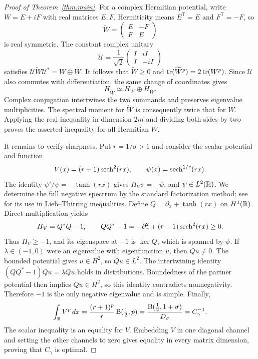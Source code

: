\begin{proof}[Proof of Theorem~\ref{thm:main}]
For a complex Hermitian potential, write $W=E+iF$ with real matrices $E,F$.
Hermiticity means $E^{\mathsf T}=E$ and $F^{\mathsf T}=-F$, so
\[
 \widetilde W=\begin{pmatrix}E&-F\\ F&E\end{pmatrix}
\]
is real symmetric.  The constant complex unitary
\[
 \mathcal U=\frac1{\sqrt2}
             \begin{pmatrix}I&iI\\ I&-iI\end{pmatrix}
\]
satisfies $\mathcal U\widetilde W\mathcal U^*
=W\oplus\overline W$.  It follows that $\widetilde W\geq0$ and
$\operatorname{tr}(\widetilde W^p)=2\operatorname{tr}(W^p)$.  Since $\mathcal U$ also commutes with
differentiation, the same change of coordinates gives
\[
 H_{\widetilde W}\simeq H_W\oplus H_{\overline W}.
\]
Complex conjugation intertwines the two summands and preserves eigenvalue
multiplicities.  The spectral moment for $\widetilde W$ is consequently twice
that for $W$.  Applying the real inequality in dimension $2m$ and dividing
both sides by two proves the asserted inequality for all Hermitian $W$.

It remains to verify sharpness.  Put $r=1/\sigma>1$ and consider the scalar
potential and function
\[
 V(x)=(r+1)\operatorname{sech}^2(rx),
 \qquad \psi(x)=\operatorname{sech}^{1/r}(rx).
\]
The identity $\psi'/\psi=-\tanh(rx)$ gives $H_V\psi=-\psi$, and
$\psi\in L^2(\mathbb R)$.  We determine the full negative spectrum by the standard
factorization method; see~\cite[Sections~II--III]{BenguriaLoss2000} for its use
in Lieb--Thirring inequalities.  Define
$Q=\partial_x+\tanh(rx)$ on $H^1(\mathbb R)$.  Direct multiplication yields
\[
 H_V=Q^*Q-1,
 \qquad QQ^*-1=-\partial_x^2+(r-1)\operatorname{sech}^2(rx)\geq0.
\]
Thus $H_V\geq-1$, and its eigenspace at $-1$ is $\ker Q$, which is spanned
by $\psi$.  If $\lambda\in(-1,0)$ were an eigenvalue with eigenfunction $u$,
then $Qu\ne0$.  The bounded potential gives $u\in H^2$, so $Qu\in L^2$.
The intertwining identity $(QQ^*-1)Qu=\lambda Qu$ holds in distributions.
Boundedness of the partner potential then implies $Qu\in H^2$, so this
identity contradicts nonnegativity.  Therefore $-1$ is the only negative
eigenvalue and is simple.
Finally,
\[
 \int_\mathbb R V^p\,dx
  =\frac{(r+1)^p}{r}\,\mathrm B(\tfrac12,p)
  =\frac{\mathrm B(\tfrac12,1+\sigma)}{D_\sigma}
  =C_\gamma^{-1}.
\]
The scalar inequality is an equality for $V$.  Embedding $V$ in one diagonal
channel and setting the other channels to zero gives equality in every
matrix dimension, proving that $C_\gamma$ is optimal.
\end{proof}
